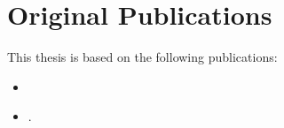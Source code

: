 \chapter*{Original Publications}

This thesis is based on the following publications:
\begin{itemize}
	\item {}
	\item {}.
\end{itemize}
